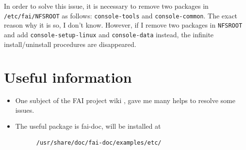 \documentclass[11pt
  , a4paper
  , article
  , oneside
]{memoir}
\begin{document}
In order to solve this issue, it is necessary to remove two packages in \texttt{/etc/fai/NFSROOT} as follows:
\texttt{console-tools} and \texttt{console-common}. The exact reason why it is so, I don't know. However, if I remove two packages in \texttt{NFSROOT} and add \texttt{console-setup-linux} and \texttt{console-data} instead, the infinite install/uninstall procedures are disappeared.


 

\section{Useful information}
\begin{itemize}
  \item One subject of the FAI project wiki \citep{FAIWikiWorkthrough}, gave me many helps to resolve some issues. 
  \item The useful package is fai-doc, will be installed at 
    \begin{lstlisting}
      /usr/share/doc/fai-doc/examples/etc/    \end{lstlisting}
\end{itemize}

\clearpage
%
%
%

%

\end{document}
